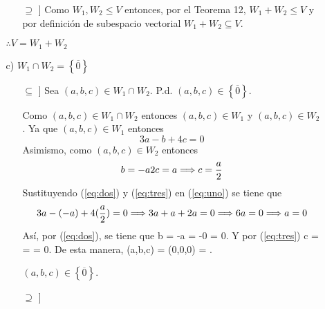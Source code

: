 \documentclass[fleqn]{article}
\begin{document}
\begin{enumerate}
\begin{enumerate}
\begin{enumerate}
                \item[$ \supseteq $]] Como $ W_1, W_2 \leq V $ entonces, por el Teorema 12, $ W_1 + W_2 \leq V $ y por definición de subespacio vectorial $ W_1 + W_2 \subseteq V $.
            \end{enumerate}
            $ \therefore V = W_1 + W_2 $ \par
            
            \item[c)] $ W_1 \cap W_2 = \left \{\overline{0} \right \} $
            \begin{enumerate}
                \item[$ \subseteq $]] Sea $ (a,b,c) \in W_1 \cap W_2 $. P.d. $ (a,b,c) \in \left \{\overline{0} \right \} $.

                Como $ (a,b,c) \in W_1 \cap W_2 $ entonces $ (a,b,c) \in W_1 $ y $ (a,b,c) \in W_2 $. Ya que $ (a,b,c) \in W_1 $ entonces 
                \begin{equation}
                    3a - b + 4c = 0
                    \label{eq:uno}
                \end{equation}
                Asimismo, como $ (a,b,c) \in W_2 $ entonces 
                \begin{equation}
                    b = -a 
                    \label{eq:dos} \\
                    2c = a \\
                    \Longrightarrow c = \frac{a}{2}
                    \label{eq:tres}
                \end{equation}
                Sustituyendo (\ref{eq:dos}) y (\ref{eq:tres}) en (\ref{eq:uno}) se tiene que
                \begin{equation*}
                    3a - (-a) + 4(\frac{a}{2}) = 0 \\
                    \Longrightarrow 3a + a + 2a = 0 \\
                    \Longrightarrow 6a = 0 \\
                    \Longrightarrow a = 0
                \end{equation*}
                Así, por (\ref{eq:dos}), se tiene que b = -a = -0 = 0. Y por (\ref{eq:tres}) c =  =  = 0. De esta manera, (a,b,c) = (0,0,0) = . \par
                \therefore $ (a,b,c) \in \left \{\overline{0} \right \} $.

                \item[$ \supseteq $]]

                

            \end{enumerate}

        \end{enumerate}
        
        
        
    \end{enumerate}
\end{document}
